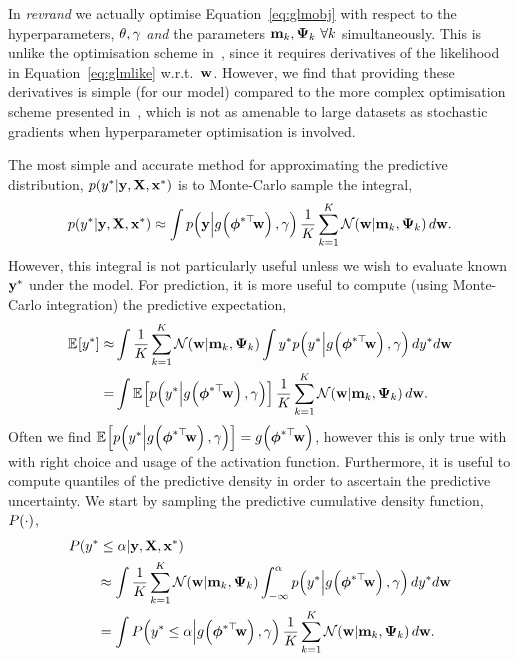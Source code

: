 \documentclass[11pt, oneside]{article}
\begin{document}
In \emph{revrand} we actually optimise Equation~\eqref{eq:glmobj} with respect
to the hyperparameters, $\theta, \gamma$ \emph{and} the parameters $\mathbf{m}_k,
\boldsymbol{\Psi}_k~\forall k$ simultaneously. This is unlike the optimisation scheme 
in~\cite{gershman2012}, since it requires  derivatives of the
likelihood in Equation~\eqref{eq:glmlike} w.r.t.\ $\mathbf{w}$. However, we find
that providing these derivatives is simple (for our model) compared to the more
complex optimisation scheme presented in~\cite{gershman2012}, which is not as
amenable to large datasets as stochastic gradients when hyperparameter 
optimisation is involved.

The most simple and accurate method for approximating the predictive
distribution, $p\!\left({y^{*}}\middle\vert{\ensuremath{\mathbf{y}}, \ensuremath{\mathbf{X}}, \ensuremath{\mathbf{x}}\ensuremath{^{*}}}\right)$ is to Monte-Carlo
sample the integral,
\begin{equation}
    p\!\left({y^{*}}\middle\vert{\ensuremath{\mathbf{y}}, \ensuremath{\mathbf{X}}, \ensuremath{\mathbf{x}}\ensuremath{^{*}}}\right) \approx
    \int p\!\left({\mathbf{y}}\middle\vert{\ensuremath{{g}_{}\!\left({{\boldsymbol\phi^{*\top}\!\mathbf{w}}}\right)}, \ensuremath{\gamma}}\right)
    \frac{1}{K} \sum^K_{k=1} \mathcal{N}\!\left({\mathbf{w}}\middle\vert{\ensuremath{\mathbf{m}}_k, \ensuremath{\boldsymbol{\Psi}}_k}\right) d \mathbf{w}.
    \label{eq:glppred}
\end{equation}
However, this integral is not particularly useful unless we wish to evaluate
known $\mathbf{y}^{*}$ under the model. For prediction, it is more useful to
compute (using Monte-Carlo integration) the predictive expectation, 
\begin{align}
    \expece{}{\targs\test} \approx&
    \int \frac{1}{K} \sum^K_{k=1} \gausC{\weights}{\pomean_k, \dpocov_k}
    \int \targs\test \probC{\targs\test}{\activ{\feats\testT\weights}, \lparam}
    d \targs\test d \weights
    \nonumber\\
    =& \int \expece{}{\probC{\targs\test}
        {\activ{\feats\testT\weights}, \lparam}}
    \frac{1}{K} \sum^K_{k=1} \gausC{\weights}{\pomean_k, \dpocov_k}
    d \weights.
    \label{eq:glmexpec}
\end{align}
Often we find $\mathbb{E}_{}\!\left[{p\!\left({y^{*}}\middle\vert{\ensuremath{{g}_{}\!\left({{\boldsymbol\phi^{*\top}\!\mathbf{w}}}\right)},
        \ensuremath{\gamma}}\right)}\right] = {g}_{}\!\left({{\boldsymbol\phi^{*\top}\!\mathbf{w}}}\right)$, however this is only true
with with right choice and usage of the activation function. Furthermore, it is
useful to compute quantiles of the predictive density in order to ascertain the
predictive uncertainty. We start by sampling the predictive cumulative density
function, $P\!\left({\cdot}\right)$,
\begin{align}
    &\ProbC{\targs\test \leq \cdfAlph}{\targ, \ins, \inss\test} \nonumber\\ 
    &\qquad\approx \int 
    \frac{1}{K} \sum^K_{k=1} \gausC{\weights}{\pomean_k, \dpocov_k}
    \int^{\cdfAlph}_{-\infty} 
    \probC{\targs\test}{\activ{\feats\testT\weights}, \lparam}
    d \targs\test d \weights \nonumber\\
    &\qquad= \int
    \ProbC{\targs\test \leq \cdfAlph}{\activ{\feats\testT\weights}, \lparam}
    \frac{1}{K} \sum^K_{k=1} \gausC{\weights}{\pomean_k, \dpocov_k}
    d \weights.
    \label{eq:lapexpec}
\end{align}
\end{document}
